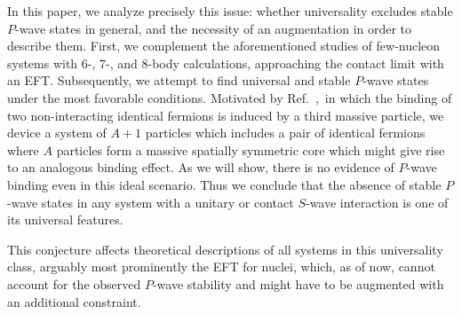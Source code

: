 \documentclass[onecolumn,preprint,superscriptaddress,nofootinbib]{revtex4-1}
\begin{document}
In this paper, we analyze precisely this issue: whether universality
excludes stable $P$-wave states in general, and the necessity of an augmentation in order to describe them. 
First, we complement the aforementioned studies of few-nucleon systems with 6-, 7-, and 8-body calculations,
approaching the contact limit with an EFT. 
Subsequently, we attempt to find universal and stable $P$-wave states under the most favorable conditions.
Motivated by Ref.~\cite{Kartavtsev_2007},~in which the binding of two non-interacting identical fermions is induced by a third massive particle, we device a system of $A+1$ particles which includes a pair of identical fermions where $A$ particles form a
massive spatially symmetric core which might give rise to an analogous binding effect. 
As we will show, there is no evidence of $P$-wave binding even in this ideal scenario.
Thus we conclude that the absence of stable $P$-wave states in any system with a unitary
or contact $S$-wave interaction is one of its universal features.

This conjecture affects theoretical descriptions of all systems in this universality class,
arguably most prominently the EFT for nuclei, which, as of now, cannot account for the
observed $P$-wave stability 
and might have to be augmented with an additional constraint.

\end{document}
